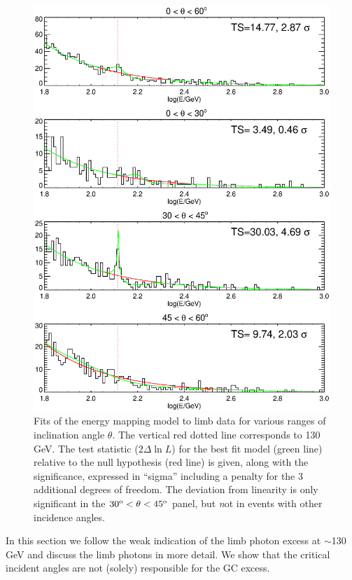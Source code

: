 \documentclass[aps,twocolumn,prd,superscriptaddress,showpacs,nofootinbib,fixfloat]{revtex4}
\newcommand{\degree}{^{\rm o}}
\begin{document}
\begin{figure}
  \centering
  \includegraphics[width=1.0\linewidth]{plots/limbfits.ps}
  \caption{Fits of the energy mapping model to limb data for
  various ranges of inclination angle $\theta$.  The
  vertical red dotted line corresponds to 130 GeV.  The test
  statistic ($2\Delta\ln L$) for the best fit model (green
  line) relative to the null hypothesis (red line) is given,
  along with the significance, expressed in ``sigma''
  including a penalty for the 3 additional degrees of
  freedom.  The deviation from linearity is only significant
  in the $30\degree < \theta < 45\degree$ panel, but {\emph not} in events with other incidence angles.}
  \label{fig:limbfits}
\end{figure}


In this section we follow the weak indication of the limb
photon excess at $\sim$130 GeV and discuss the limb photons
in more detail. We show that the critical incident angles
are not (solely) responsible for the GC excess.
\end{document}
